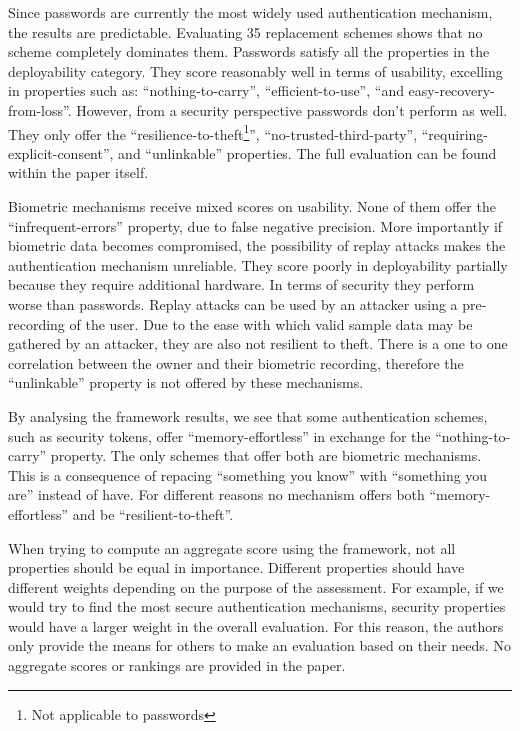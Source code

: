 Since passwords are currently the most widely used authentication mechanism, the results are predictable. Evaluating 35 replacement schemes shows that no scheme completely dominates them. Passwords satisfy all the properties in the deployability category. They score reasonably well in terms of usability, excelling in properties such as: ``nothing-to-carry'', ``efficient-to-use'', ``and easy-recovery-from-loss''. However, from a security perspective passwords don't perform as well. They only offer the ``resilience-to-theft\footnote{Not applicable to passwords}'', ``no-trusted-third-party'', ``requiring-explicit-consent'', and ``unlinkable'' properties. The full evaluation can be found within the paper itself.

Biometric mechanisms receive mixed scores on usability. None of them offer the ``infrequent-errors'' property, due to false negative precision. More importantly if biometric data becomes compromised, the possibility of replay attacks makes the authentication mechanism unreliable. They score poorly in deployability partially because they require additional hardware. In terms of security they perform worse than passwords. Replay attacks can be used by an attacker using a pre-recording of the user. Due to the ease with which valid sample data may be gathered by an attacker, they are also not resilient to theft. There is a one to one correlation between the owner and their biometric recording, therefore the ``unlinkable'' property is not offered by these mechanisms. 

By analysing the framework results, we see that some authentication schemes, such as security tokens, offer ``memory-effortless'' in exchange for the ``nothing-to-carry'' property.  The only schemes that offer both are biometric mechanisms. This is a consequence of repacing ``something you know'' with ``something you are'' instead of have. For different reasons no mechanism offers both ``memory-effortless'' and be ``resilient-to-theft''.

When trying to compute an aggregate score using the framework, not all properties should be equal in importance. Different properties should have different weights depending on the purpose of the assessment. For example, if we would try to find the most secure authentication mechanisms, security properties would have a larger weight in the overall evaluation. For this reason, the authors only provide the means for others to make an evaluation based on their needs. No aggregate scores or rankings are provided in the paper. 

